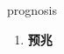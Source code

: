 
\begin{frame}
{\huge prognosis}
\begin{center}
\begin{enumerate}\Large
  \item \textbf{预兆}
\end{enumerate}
\end{center}
\end{frame}
